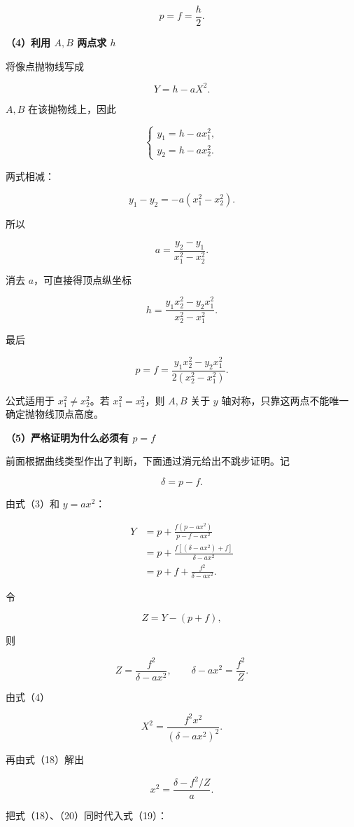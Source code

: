 \documentclass[12pt,a4paper,UTF8]{ctexart}
\begin{document}
\[
\boxed{p=f=\frac h2}.\tag{11}
\]

\textbf{（4）利用 \(A,B\) 两点求 \(h\)}

将像点抛物线写成

\[
Y=h-aX^2.\tag{12}
\]

\(A,B\) 在该抛物线上，因此

\[
\begin{cases}
y_1=h-ax_1^2,\\
y_2=h-ax_2^2.
\end{cases}\tag{13}
\]

两式相减：

\[
y_1-y_2=-a(x_1^2-x_2^2).
\]

所以

\[
a=\frac{y_2-y_1}{x_1^2-x_2^2}.\tag{14}
\]

消去 \(a\)，可直接得顶点纵坐标

\[
\boxed{
h=\frac{y_1x_2^2-y_2x_1^2}{x_2^2-x_1^2}
}.\tag{15}
\]

最后

\[
\boxed{
p=f=\frac{y_1x_2^2-y_2x_1^2}
{2(x_2^2-x_1^2)}
}.\tag{16}
\]

公式适用于 \(x_1^2\ne x_2^2\)。若 \(x_1^2=x_2^2\)，则 \(A,B\) 关于 \(y\)
轴对称，只靠这两点不能唯一确定抛物线顶点高度。

\textbf{（5）严格证明为什么必须有 \(p=f\)}

前面根据曲线类型作出了判断，下面通过消元给出不跳步证明。记

\[
\delta=p-f.
\]

由式（3）和 \(y=ax^2\)：

\[
\begin{aligned}
Y
&=p+\frac{f(p-ax^2)}{p-f-ax^2}\\
&=p+\frac{f[(\delta-ax^2)+f]}{\delta-ax^2}\\
&=p+f+\frac{f^2}{\delta-ax^2}.
\end{aligned}
\tag{17}
\]

令

\[
Z=Y-(p+f),
\]

则

\[
Z=\frac{f^2}{\delta-ax^2},
\qquad
\delta-ax^2=\frac{f^2}{Z}.
\tag{18}
\]

由式（4）

\[
X^2=\frac{f^2x^2}{(\delta-ax^2)^2}.
\tag{19}
\]

再由式（18）解出

\[
x^2=\frac{\delta-f^2/Z}{a}.
\tag{20}
\]

把式（18）、（20）同时代入式（19）：
\end{document}
